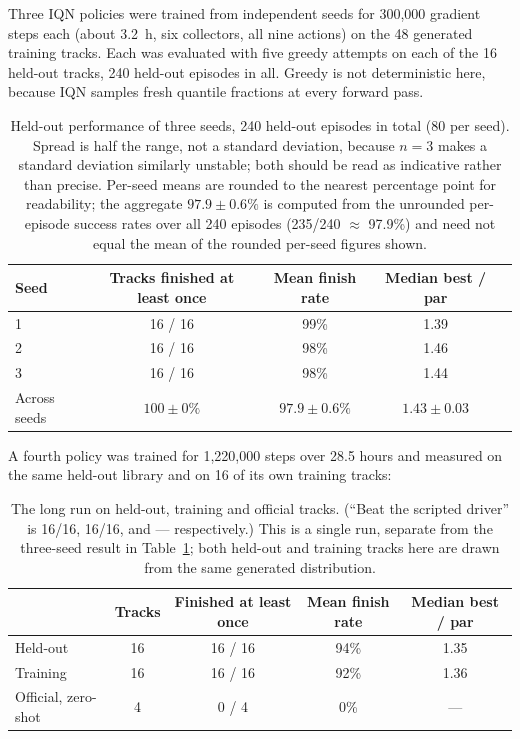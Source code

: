 \documentclass[11pt]{article}
\begin{document}
Three IQN policies were trained from independent seeds for 300,000 gradient steps each (about 3.2~h, six collectors, all nine actions) on the 48 generated training tracks. Each was evaluated with five greedy attempts on each of the 16 held-out tracks, 240 held-out episodes in all. Greedy is not deterministic here, because IQN samples fresh quantile fractions at every forward pass.

\begin{table}[h]
\centering
\begin{tabular}{@{}lcccc@{}}
\toprule
\textbf{Seed} & \textbf{Tracks finished at least once} & \textbf{Mean finish rate} & \textbf{Median best / par} \\
\midrule
1 & 16 / 16 & 99\% & 1.39 \\
2 & 16 / 16 & 98\% & 1.46 \\
3 & 16 / 16 & 98\% & 1.44 \\
\midrule
Across seeds & $100 \pm 0\%$ & $97.9 \pm 0.6\%$ & $1.43 \pm 0.03$ \\
\bottomrule
\end{tabular}
\caption{Held-out performance of three seeds, 240 held-out episodes in total (80 per seed). Spread is half the range, not a standard deviation, because $n=3$ makes a standard deviation similarly unstable; both should be read as indicative rather than precise. Per-seed means are rounded to the nearest percentage point for readability; the aggregate $97.9\pm0.6\%$ is computed from the unrounded per-episode success rates over all 240 episodes (235/240 $\approx$ 97.9\%) and need not equal the mean of the rounded per-seed figures shown.}
\label{tab:heldout}
\end{table}

A fourth policy was trained for 1,220,000 steps over 28.5 hours and measured on the same held-out library and on 16 of its own training tracks:

\begin{table}[h]
\centering
\small
\begin{tabular}{@{}lcccc@{}}
\toprule
 & \textbf{Tracks} & \textbf{Finished at least once} & \textbf{Mean finish rate} & \textbf{Median best / par} \\
\midrule
Held-out & 16 & 16 / 16 & 94\% & 1.35 \\
Training & 16 & 16 / 16 & 92\% & 1.36 \\
Official, zero-shot & 4 & 0 / 4 & 0\% & --- \\
\bottomrule
\end{tabular}
\caption{The long run on held-out, training and official tracks. (``Beat the scripted driver'' is 16/16, 16/16, and --- respectively.) This is a single run, separate from the three-seed result in Table~\ref{tab:heldout}; both held-out and training tracks here are drawn from the same generated distribution.}
\label{tab:longrun}
\end{table}
\end{document}
